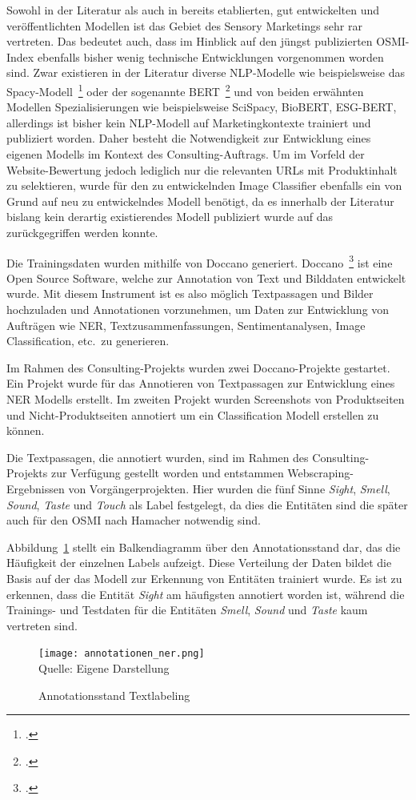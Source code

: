 Sowohl in der Literatur als auch in bereits etablierten, gut entwickelten und veröffentlichten Modellen ist das Gebiet
des Sensory Marketings sehr rar vertreten.
Das bedeutet auch, dass im Hinblick auf den jüngst publizierten \ac{OSMI}-Index ebenfalls bisher wenig technische Entwicklungen
vorgenommen worden sind.
Zwar existieren in der Literatur diverse NLP-Modelle wie beispielsweise das Spacy-Modell~\footcite[\vglf][]{spacy2017} oder der sogenannte BERT~\footcite[\vglf][]{devlin2018}
und von beiden erwähnten Modellen Spezialisierungen wie beispielsweise SciSpacy, BioBERT, ESG-BERT, allerdings ist
bisher kein \ac{NLP}-Modell auf Marketingkontexte trainiert und publiziert worden. Daher besteht die Notwendigkeit zur Entwicklung eines
eigenen Modells im Kontext des Consulting-Auftrags.
Um im Vorfeld der Website-Bewertung jedoch lediglich nur die relevanten URLs mit Produktinhalt zu selektieren, wurde für den zu
entwickelnden Image Classifier ebenfalls ein von Grund auf neu zu entwickelndes Modell benötigt, da es innerhalb der Literatur
bislang kein derartig existierendes Modell publiziert wurde auf das zurückgegriffen werden konnte.

Die Trainingsdaten wurden mithilfe von Doccano generiert.
Doccano~\footcite[\vglf][]{doccano-2018} ist eine Open Source Software, welche zur Annotation von Text und Bilddaten entwickelt wurde.
Mit diesem Instrument ist es also möglich Textpassagen und Bilder hochzuladen und Annotationen vorzunehmen, um Daten zur
Entwicklung von Aufträgen wie \acl{NER}, Textzusammenfassungen, Sentimentanalysen, Image Classification, etc.\ zu generieren.

Im Rahmen des Consulting-Projekts wurden zwei Doccano-Projekte gestartet.
Ein Projekt wurde für das Annotieren von Textpassagen zur Entwicklung eines \acl{NER} Modells erstellt.
Im zweiten Projekt wurden Screenshots von Produktseiten und Nicht-Produktseiten annotiert um ein Classification Modell erstellen zu können.

Die Textpassagen, die annotiert wurden, sind im Rahmen des Consulting-Projekts zur Verfügung gestellt worden und entstammen
Webscraping-Ergebnissen von Vorgängerprojekten.
Hier wurden die fünf Sinne \textit{Sight}, \textit{Smell}, \textit{Sound}, \textit{Taste} und \textit{Touch} als Label festgelegt, da dies die Entitäten sind die später auch für den OSMI nach Hamacher notwendig sind.

Abbildung~\ref{fig:annotation_ner} stellt ein Balkendiagramm über den Annotationsstand dar, das die Häufigkeit der einzelnen Labels aufzeigt. Diese Verteilung der Daten bildet die Basis auf der das Modell zur Erkennung von Entitäten trainiert wurde.
Es ist zu erkennen, dass die Entität \textit{Sight} am häufigsten annotiert worden ist, während die Trainings- und Testdaten für
die Entitäten \textit{Smell}, \textit{Sound} und \textit{Taste} kaum vertreten sind.
\begin{figure}[H]
	\caption{Annotationsstand Textlabeling}\label{fig:annotation_ner}
	\texttt{[image: annotationen\_ner.png]}
	\\
	Quelle: Eigene Darstellung
\end{figure}

